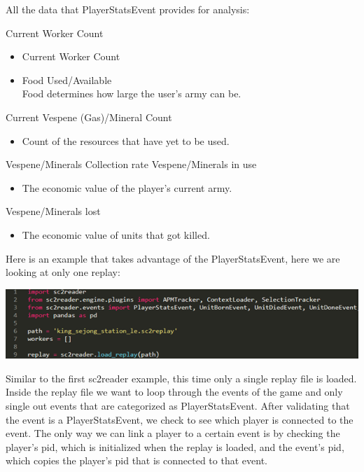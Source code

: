 \documentclass[a4paper,12pt]{report}
\begin{document}
All the data that PlayerStatsEvent provides for analysis:

Current Worker Count
\begin{itemize}[,]
    \setlength\itemsep{-.1cm}
    \item Current Worker Count
    \item Food Used/Available \\
    Food determines how large the user’s army can be.
\end{itemize}
\vspace*{-.4cm}
Current Vespene (Gas)/Mineral Count
\begin{itemize}[,]
    \setlength\itemsep{-.1cm}
    \item Count of the resources that have yet to be used.
\end{itemize}
\vspace*{-.4cm}
Vespene/Minerals Collection rate
\vspace*{-.4cm}
Vespene/Minerals in use
\begin{itemize}[,]
    \setlength\itemsep{-.1cm}
    \item The economic value of the player’s current army.
\end{itemize}
\vspace*{-.4cm}
Vespene/Minerals lost
\begin{itemize}[,]
    \setlength\itemsep{-.1cm}
    \item The economic value of units that got killed.
\end{itemize}

Here is an example that takes advantage of the PlayerStatsEvent, here we are looking at only one replay:

\begin{center}
    \captionsetup{type=figure}
    \includegraphics[width=.9\linewidth]{media/LoadPath.png}
\end{center}

Similar to the first sc2reader example, this time only a single replay file is loaded. Inside the replay file we want to loop through the events of the game and only single out events that are categorized as PlayerStatsEvent. After validating that the event is a PlayerStatsEvent, we check to see which player is connected to the event. The only way we can link a player to a certain event is by checking the player’s pid, which is initialized when the replay is loaded, and the event’s pid, which copies the player’s pid that is connected to that event.
\end{document}

